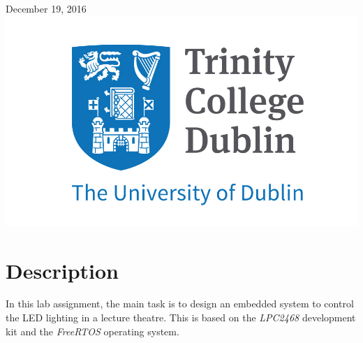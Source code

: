 \begin{titlepage}

{\large December 19, 2016}\\[2cm] %

\includegraphics{trinity.jpg}\\[1cm] %
 

\vfill %

\end{titlepage}



\section{Description}

In this lab assignment, the main task is to design an embedded system to control the LED lighting in a lecture theatre. This is based on the \textit{LPC2468} development kit and the \textit{FreeRTOS} operating system.  \\


